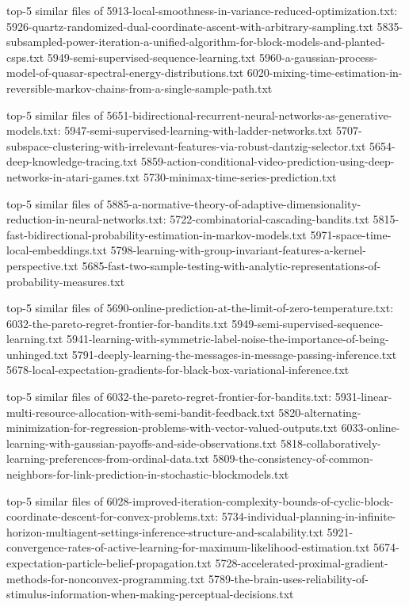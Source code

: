 \documentclass[11pt]{article}
\begin{document}
top-5 similar files of
5913-local-smoothness-in-variance-reduced-optimization.txt:
5926-quartz-randomized-dual-coordinate-ascent-with-arbitrary-sampling.txt
5835-subsampled-power-iteration-a-unified-algorithm-for-block-models-and-planted-csps.txt
5949-semi-supervised-sequence-learning.txt
5960-a-gaussian-process-model-of-quasar-spectral-energy-distributions.txt
6020-mixing-time-estimation-in-reversible-markov-chains-from-a-single-sample-path.txt

top-5 similar files of
5651-bidirectional-recurrent-neural-networks-as-generative-models.txt:
5947-semi-supervised-learning-with-ladder-networks.txt
5707-subspace-clustering-with-irrelevant-features-via-robust-dantzig-selector.txt
5654-deep-knowledge-tracing.txt
5859-action-conditional-video-prediction-using-deep-networks-in-atari-games.txt
5730-minimax-time-series-prediction.txt

top-5 similar files of
5885-a-normative-theory-of-adaptive-dimensionality-reduction-in-neural-networks.txt:
5722-combinatorial-cascading-bandits.txt
5815-fast-bidirectional-probability-estimation-in-markov-models.txt
5971-space-time-local-embeddings.txt
5798-learning-with-group-invariant-features-a-kernel-perspective.txt
5685-fast-two-sample-testing-with-analytic-representations-of-probability-measures.txt

top-5 similar files of
5690-online-prediction-at-the-limit-of-zero-temperature.txt:
6032-the-pareto-regret-frontier-for-bandits.txt
5949-semi-supervised-sequence-learning.txt
5941-learning-with-symmetric-label-noise-the-importance-of-being-unhinged.txt
5791-deeply-learning-the-messages-in-message-passing-inference.txt
5678-local-expectation-gradients-for-black-box-variational-inference.txt

top-5 similar files of 6032-the-pareto-regret-frontier-for-bandits.txt:
5931-linear-multi-resource-allocation-with-semi-bandit-feedback.txt
5820-alternating-minimization-for-regression-problems-with-vector-valued-outputs.txt
6033-online-learning-with-gaussian-payoffs-and-side-observations.txt
5818-collaboratively-learning-preferences-from-ordinal-data.txt
5809-the-consistency-of-common-neighbors-for-link-prediction-in-stochastic-blockmodels.txt

top-5 similar files of
6028-improved-iteration-complexity-bounds-of-cyclic-block-coordinate-descent-for-convex-problems.txt:
5734-individual-planning-in-infinite-horizon-multiagent-settings-inference-structure-and-scalability.txt
5921-convergence-rates-of-active-learning-for-maximum-likelihood-estimation.txt
5674-expectation-particle-belief-propagation.txt
5728-accelerated-proximal-gradient-methods-for-nonconvex-programming.txt
5789-the-brain-uses-reliability-of-stimulus-information-when-making-perceptual-decisions.txt
\end{document}

